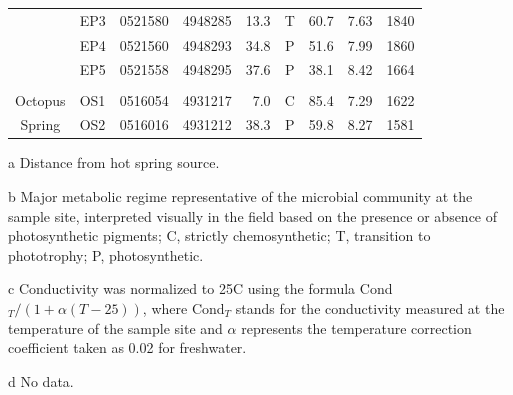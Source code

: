 {\begin{table}[htbp]
\begin{adjustbox}{width=\textwidth,keepaspectratio}
\begin{threeparttable}
\begin{tabular}{clccrcccc}
      & EP3   & 0521580 & 4948285 & 13.3  & T     & 60.7  & 7.63  & 1840 \\
      & EP4   & 0521560 & 4948293 & 34.8  & P     & 51.6  & 7.99  & 1860 \\
      & EP5   & 0521558 & 4948295 & 37.6  & P     & 38.1  & 8.42  & 1664 \\
      &       &       &       &       &       &       &       &  \\
Octopus & OS1   & 0516054 & 4931217 & 7.0   & C     & 85.4  & 7.29  & 1622 \\
Spring & OS2   & 0516016 & 4931212 & 38.3  & P     & 59.8  & 8.27  & 1581 \\
\bottomrule
\end{tabular}%


    \begin{tablenotes}
      \small
      \item[a] Distance from hot spring source.
      \item[b] Major metabolic regime representative of the microbial community at the sample site, interpreted visually in the field based on the presence or absence of photosynthetic pigments; C, strictly chemosynthetic; T, transition to phototrophy; P, photosynthetic.
      \item[c] Conductivity was normalized to 25\degree C using the formula Cond$_{T}/(1+\alpha(T-25))$, where Cond$_{T}$ stands for the conductivity measured at the temperature of the sample site and $\alpha$ represents the temperature correction coefficient taken as 0.02 for freshwater.
      \item[d] No data.
    \end{tablenotes}
  \label{tab:geophysical}%
  \end{threeparttable}
  \end{adjustbox}
\end{table}%
\doublespace
\clearpage
}




